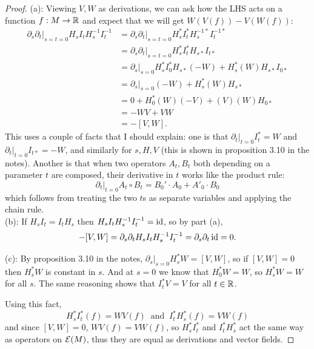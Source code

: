 \documentclass{amsart}
\begin{document}
	\begin{proof}
		(a): Viewing $V,W$ as derivations, we can ask how the LHS acts on a function $f:M\to \mathbb{R}$ and expect that we will get $W(V(f))-V(W(f))$:
		\begin{align*}
			\partial_s\partial_t \big|_{s=t=0} H_sI_tH_s^{-1}I_t^{-1} &= \partial_s\partial_t \big|_{s=t=0} H_s^*I_t^*H_s^{-1*}I_t^{-1*}\\
			&= \partial_s\partial_t \big|_{s=t=0} H_s^*I_t^*H_{s*}I_{t*}\\
			&=  \partial_s\big|_{s=0} H_s^*I_0^*H_{s*} (-W) + H_s^*(W)H_{s*}I_{0*}\\
			&= \partial_s\big|_{s=0} (-W) + H_s^*(W)H_{s*}\\
			&= 0 + H_0^*(W)(-V) + (V)(W)H_{0*}\\
			&= -WV + VW\\
			&= -[V,W].
		\end{align*}
		This uses a couple of facts that I should explain: one is that $\partial_t|_{t=0} I_t^*=W$ and $\partial_t|_{t=0}I_{t*}=-W$, and similarly for $s,H,V$ (this is shown in proposition 3.10 in the notes). Another is that when two operators $A_t,B_t$ both depending on a parameter $t$ are composed, their derivative in $t$ works like the product rule:
		$$
		\partial_t|_{t=0} A_t\circ B_t = B_0'\cdot A_0 + A'_0\cdot B_0
		$$
		which follows from treating the two $t$s as separate variables and applying the chain rule.\\
		
		(b): If $H_sI_t=I_tH_s$ then $H_sI_tH_s^{-1}I_t^{-1}=\operatorname{id}$, so by part (a), 
		$$-[V,W] = \partial_s\partial_t H_sI_tH_s^{-1}I_t^{-1} = \partial_s\partial_t \operatorname{id} = 0.$$
		
		(c): By proposition 3.10 in the notes, $\partial_s|_{s=0} H_s^*W = [V,W]$, so if $[V,W]=0$ then $H_s^*W$ is constant in $s$. And at $s=0$ we know that $H_0^*W=W$, so $H_s^*W=W$ for all $s$. The same reasoning shows that $I_t^*V=V$ for all $t\in \mathbb{R}$.
		
		Using this fact, 
		$$H_s^*I_t^*(f) = WV(f) \;\; \text{and} \;\; I_t^*H_s^*(f)=VW(f)$$ and since $[V,W]=0$, $WV(f)=VW(f)$, so $H_s^*I_t^*$ and $I_t^*H_s^*$ act the same way as operators on $\mathcal{E}(M)$, thus they are equal as derivations and vector fields.
		 
	\end{proof}
\end{document}
